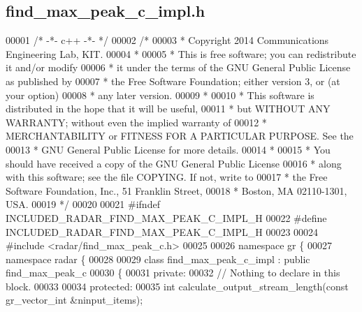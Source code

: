 \subsection{find\+\_\+max\+\_\+peak\+\_\+c\+\_\+impl.\+h}
\label{find__max__peak__c__impl_8h_source}

\begin{DoxyCode}
00001 \textcolor{comment}{/* -*- c++ -*- */}
00002 \textcolor{comment}{/* }
00003 \textcolor{comment}{ * Copyright 2014 Communications Engineering Lab, KIT.}
00004 \textcolor{comment}{ * }
00005 \textcolor{comment}{ * This is free software; you can redistribute it and/or modify}
00006 \textcolor{comment}{ * it under the terms of the GNU General Public License as published by}
00007 \textcolor{comment}{ * the Free Software Foundation; either version 3, or (at your option)}
00008 \textcolor{comment}{ * any later version.}
00009 \textcolor{comment}{ * }
00010 \textcolor{comment}{ * This software is distributed in the hope that it will be useful,}
00011 \textcolor{comment}{ * but WITHOUT ANY WARRANTY; without even the implied warranty of}
00012 \textcolor{comment}{ * MERCHANTABILITY or FITNESS FOR A PARTICULAR PURPOSE.  See the}
00013 \textcolor{comment}{ * GNU General Public License for more details.}
00014 \textcolor{comment}{ * }
00015 \textcolor{comment}{ * You should have received a copy of the GNU General Public License}
00016 \textcolor{comment}{ * along with this software; see the file COPYING.  If not, write to}
00017 \textcolor{comment}{ * the Free Software Foundation, Inc., 51 Franklin Street,}
00018 \textcolor{comment}{ * Boston, MA 02110-1301, USA.}
00019 \textcolor{comment}{ */}
00020 
00021 \textcolor{preprocessor}{#ifndef INCLUDED\_RADAR\_FIND\_MAX\_PEAK\_C\_IMPL\_H}
00022 \textcolor{preprocessor}{#define INCLUDED\_RADAR\_FIND\_MAX\_PEAK\_C\_IMPL\_H}
00023 
00024 \textcolor{preprocessor}{#include <radar/find_max_peak_c.h>}
00025 
00026 \textcolor{keyword}{namespace }gr \{
00027   \textcolor{keyword}{namespace }radar \{
00028 
00029     \textcolor{keyword}{class }find_max_peak_c_impl : \textcolor{keyword}{public} find_max_peak_c
00030     \{
00031      \textcolor{keyword}{private}:
00032       \textcolor{comment}{// Nothing to declare in this block.}
00033 
00034      \textcolor{keyword}{protected}:
00035       \textcolor{keywordtype}{int} calculate_output_stream_length(\textcolor{keyword}{const} gr\_vector\_int &ninput\_items);

\end{DoxyCode}
